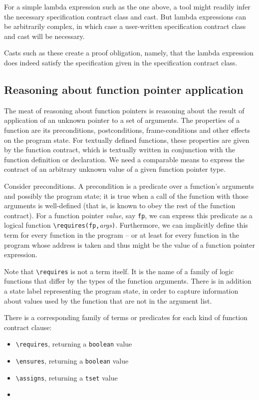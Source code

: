 For a simple lambda expression such as the one above, a tool might readily infer the necessary specification contract class and cast. But lambda expressions can be arbitrarily complex, in which case a user-written specification contract class and cast will be necessary.

Casts such as these create a proof obligation, namely, that the 
lambda expression does indeed satisfy the specification given in the
specification contract class.

\subsection{Reasoning about function pointer application}
\label{sec:fpreasoning}
The meat of reasoning about function pointers is reasoning about the result of application of an unknown pointer to a set of arguments. 
The properties of a function are its
preconditions, postconditions, frame-conditions and other effects on the program state. 
For textually defined functions, these properties are given by 
the function contract, which is textually written in
conjunction with the function definition or declaration.
We need a comparable means to express the contract of an
arbitrary unknown value of a given function pointer type.

Consider preconditions. 
A precondition is a predicate over a
function's arguments and possibly the program state; it is 
true when a call of the function with those arguments is 
well-defined (that is, is known to obey the rest of the function contract). 
For a function pointer \emph{value}, say \lstinline|fp|, we can express this predicate as a logical function
\lstinline|\requires(fp,|\emph{args}\lstinline|)|. 
Furthermore, we can implicitly define this term for every function in the program -- or at least for every function in the program whose address is taken and thus might be the value of a function pointer expression.

Note that \lstinline|\requires| is not a term itself. It is the name of a family of logic functions that differ by the types of the function arguments. There is in addition a state label representing the program state, in order to capture
information about values used by the function that are not in
the argument list. 

There is a corresponding family of terms or predicates for each kind of function contract clause:
\begin{itemize}[noitemsep,nolistsep]
	\item \lstinline|\requires|, returning a \lstinline|boolean| value
	\item \lstinline|\ensures|, returning a \lstinline|boolean| value
	\item\lstinline|\assigns|, returning a \lstinline|tset| value
	\item {}
\end{itemize}

